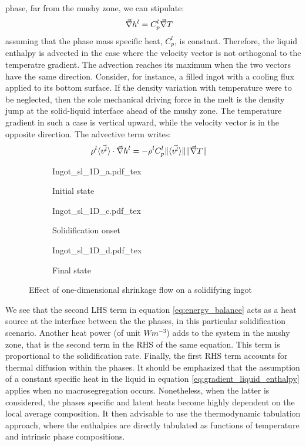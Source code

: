 phase, far from the mushy zone, we can stipulate:
%
\begin{align}
\label{eq:gradient_liquid_enthalpy}
& \vec{\nabla} h^l = C_p^l \vec{\nabla} T
\end{align}
%
assuming that the phase mass specific heat, $ C_p^l $, is constant. Therefore, the liquid enthalpy
is advected in the case where the velocity vector is not orthogonal to the temperatre gradient.
The advection reaches its maximum when the two vectors have the same direction. Consider, for instance,
a filled ingot with a cooling flux applied to its bottom surface. If the density variation with temperature
were to be neglected, then the sole mechanical driving force in the melt is the density jump at the solid-liquid
interface ahead of the mushy zone. The temperature gradient in such a case is vertical upward, while the velocity
vector is in the opposite direction. The advective term writes:
%
\begin{align}
\label{eq:enthalpy_advection}
& \rho^l \langle \vec{v^l} \rangle \cdot \vec{\nabla} h^l = - \rho^l C_p^l \lVert \langle \vec{v^l} \rangle \rVert \lVert \vec{\nabla} T \rVert
\end{align}
%
\begin{figure}
\centering
\begin{subfigure}[h!]{0.3\textwidth}\centering %
	\def\svgwidth{100pt}
	{Ingot_sl_1D_a.pdf_tex}
	\caption{Initial state}
	\label{fig:ingot_1d_a}
\end{subfigure}
\begin{subfigure}[h!]{0.3\textwidth}\centering %
	\centering
	\def\svgwidth{100pt}
	{Ingot_sl_1D_c.pdf_tex}
	\caption{Solidification onset}
	\label{fig:ingot_1d_c}
\end{subfigure}
\begin{subfigure}[h!]{0.3\textwidth}\centering %
	\centering
	\def\svgwidth{100pt}
	{Ingot_sl_1D_d.pdf_tex}
	\caption{Final state}
	\label{fig:ingot_1d_d}
\end{subfigure}
\caption{Effect of one-dimensional shrinkage flow on a solidifying ingot}
\end{figure}
%
We see that the second LHS term in equation \eqref{eq:energy_balance} acts as 
a heat source at the interface between the the phases, in this particular solidification
scenario. Another heat power (of unit $Wm^{-3}$) adds to the system in the mushy zone, 
that is the second term in the RHS of the same equation. This term is 
proportional to the solidification rate. Finally, the first RHS term accounts for thermal 
diffusion within the phases.
\newline
It should be emphasized that the assumption of a constant specific heat in the liquid in 
equation \eqref{eq:gradient_liquid_enthalpy} applies when no macrosegregation occurs. 
Nonetheless, when the latter is considered, the phases specific and latent heats become 
highly dependent on the local average composition. It then advisable to use the thermodynamic 
tabulation approach, where the enthalpies are directly tabulated as functions of temperature 
and intrinsic phase compositions. 
